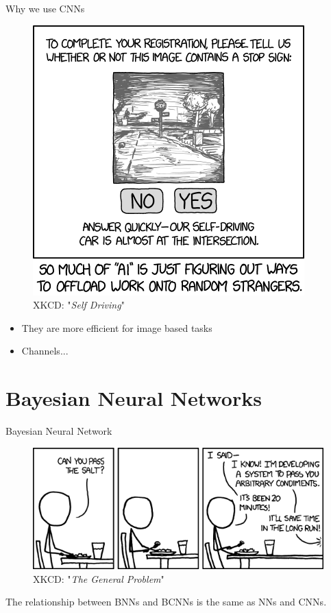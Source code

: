 \documentclass{beamer}
\begin{document}
\begin{frame}{Why we use CNNs}
	\begin{multicols}{2}
		\begin{figure}
			\includegraphics[width=.45\textwidth]{../Images/xkcd_self_driving.png}
			\caption{XKCD: "\textit{Self Driving}" \cite{xkcd-self-driving}}
		\end{figure}
		
		\columnbreak
		
		\null \vfill
		\begin{itemize}
			\item They are more efficient for image based tasks
			\item Channels...
		\end{itemize}
		\vfill \null
	\end{multicols}
\end{frame}

\section{Bayesian Neural Networks}

\begin{frame}{Bayesian Neural Network}
	\begin{figure}
		\includegraphics[width=.75\textwidth]{../Images/the_general_problem.png}
		\caption{ XKCD: "\textit{The General Problem}" \cite{xkcd-general-problem}}
	\end{figure}
	The relationship between BNNs and BCNNs is the same as NNs and CNNs.
\end{frame}
\end{document}
